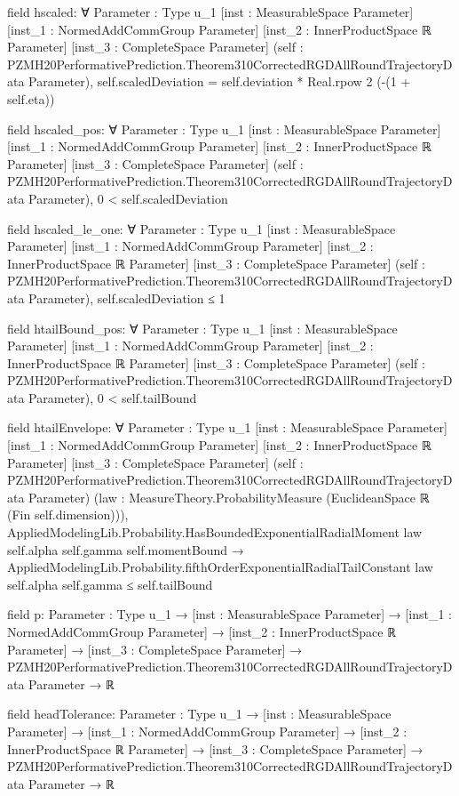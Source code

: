 \documentclass[10pt]{article}
\begin{document}
\begin{ReviewVerbatim}
field hscaled:
∀ {Parameter : Type u_1} [inst : MeasurableSpace Parameter] [inst_1 : NormedAddCommGroup Parameter]
  [inst_2 : InnerProductSpace ℝ Parameter] [inst_3 : CompleteSpace Parameter]
  (self : PZMH20PerformativePrediction.Theorem310CorrectedRGDAllRoundTrajectoryData Parameter),
  self.scaledDeviation = self.deviation * Real.rpow 2 (-(1 + self.eta))

field hscaled_pos:
∀ {Parameter : Type u_1} [inst : MeasurableSpace Parameter] [inst_1 : NormedAddCommGroup Parameter]
  [inst_2 : InnerProductSpace ℝ Parameter] [inst_3 : CompleteSpace Parameter]
  (self : PZMH20PerformativePrediction.Theorem310CorrectedRGDAllRoundTrajectoryData Parameter), 0 < self.scaledDeviation

field hscaled_le_one:
∀ {Parameter : Type u_1} [inst : MeasurableSpace Parameter] [inst_1 : NormedAddCommGroup Parameter]
  [inst_2 : InnerProductSpace ℝ Parameter] [inst_3 : CompleteSpace Parameter]
  (self : PZMH20PerformativePrediction.Theorem310CorrectedRGDAllRoundTrajectoryData Parameter), self.scaledDeviation ≤ 1

field htailBound_pos:
∀ {Parameter : Type u_1} [inst : MeasurableSpace Parameter] [inst_1 : NormedAddCommGroup Parameter]
  [inst_2 : InnerProductSpace ℝ Parameter] [inst_3 : CompleteSpace Parameter]
  (self : PZMH20PerformativePrediction.Theorem310CorrectedRGDAllRoundTrajectoryData Parameter), 0 < self.tailBound

field htailEnvelope:
∀ {Parameter : Type u_1} [inst : MeasurableSpace Parameter] [inst_1 : NormedAddCommGroup Parameter]
  [inst_2 : InnerProductSpace ℝ Parameter] [inst_3 : CompleteSpace Parameter]
  (self : PZMH20PerformativePrediction.Theorem310CorrectedRGDAllRoundTrajectoryData Parameter)
  (law : MeasureTheory.ProbabilityMeasure (EuclideanSpace ℝ (Fin self.dimension))),
  AppliedModelingLib.Probability.HasBoundedExponentialRadialMoment law self.alpha self.gamma self.momentBound →
    AppliedModelingLib.Probability.fifthOrderExponentialRadialTailConstant law self.alpha self.gamma ≤ self.tailBound

field p:
{Parameter : Type u_1} →
  [inst : MeasurableSpace Parameter] →
    [inst_1 : NormedAddCommGroup Parameter] →
      [inst_2 : InnerProductSpace ℝ Parameter] →
        [inst_3 : CompleteSpace Parameter] →
          PZMH20PerformativePrediction.Theorem310CorrectedRGDAllRoundTrajectoryData Parameter → ℝ

field headTolerance:
{Parameter : Type u_1} →
  [inst : MeasurableSpace Parameter] →
    [inst_1 : NormedAddCommGroup Parameter] →
      [inst_2 : InnerProductSpace ℝ Parameter] →
        [inst_3 : CompleteSpace Parameter] →
          PZMH20PerformativePrediction.Theorem310CorrectedRGDAllRoundTrajectoryData Parameter → ℝ


\end{ReviewVerbatim}
\end{document}
